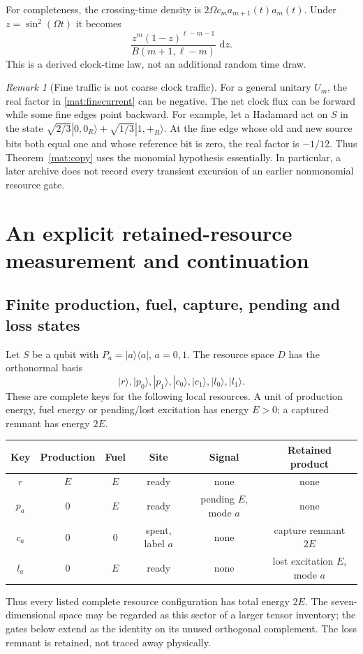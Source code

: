 \documentclass[11pt]{article}
\theoremstyle{definition}\newtheorem{definition}[theorem]{Definition}
\theoremstyle{remark}\newtheorem{remark}[theorem]{Remark}
\newcommand{\dd}{\,\mathrm d}\newcommand{\Var}{\operatorname{Var}}
\begin{document}
For completeness, the crossing-time density is
$2\Omega c_ma_{m+1}(t)a_m(t)$.  Under $z=\sin^2(\Omega t)$ it becomes
\[
 \frac{z^m(1-z)^{\ell-m-1}}{B(m+1,\ell-m)}\,\dd z.
\]
This is a derived clock-time law, not an additional random time draw.

\begin{remark}[Fine traffic is not coarse clock traffic]
\label{mat:finewarning}
For a general unitary $U_m$, the real factor in
\eqref{mat:finecurrent} can be negative.  The net clock flux can be
forward while some fine edges point backward.  For example, let a
Hadamard act on $S$ in the state
$\sqrt{2/3}|0,0_R\rangle+\sqrt{1/3}|1,+_R\rangle$.  At the fine edge
whose old and new source bits both equal one and whose reference bit
is zero, the real factor is $-1/12$.  Thus
Theorem~\ref{mat:copy} uses the monomial hypothesis essentially.
In particular, a later archive does not record every transient
excursion of an earlier nonmonomial resource gate.
\end{remark}

\section{An explicit retained-resource measurement and continuation}
\label{mat:resources}

\subsection{Finite production, fuel, capture, pending and loss states}

Let $S$ be a qubit with $P_a=|a\rangle\langle a|$, $a=0,1$.
The resource space $D$ has the orthonormal basis
\[
 |r\rangle,|p_0\rangle,|p_1\rangle,
 |c_0\rangle,|c_1\rangle,|l_0\rangle,|l_1\rangle.
\]
These are complete keys for the following local resources.  A unit of
production energy, fuel energy or pending/lost excitation has energy
$E>0$; a captured remnant has energy $2E$.
\begin{center}
\begin{tabular}{c|c c c c c}
Key & Production & Fuel & Site & Signal & Retained product\\\hline
$r$ & $E$ & $E$ & ready & none & none\\
$p_a$ & $0$ & $E$ & ready & pending $E$, mode $a$ & none\\
$c_a$ & $0$ & $0$ & spent, label $a$ & none & capture remnant $2E$\\
$l_a$ & $0$ & $E$ & ready & none & lost excitation $E$, mode $a$
\end{tabular}
\end{center}
Thus every listed complete resource configuration has total energy
$2E$.  The seven-dimensional space may be regarded as this sector of a
larger tensor inventory; the gates below extend as the identity on
its unused orthogonal complement.  The loss remnant is retained, not
traced away physically.
\end{document}
